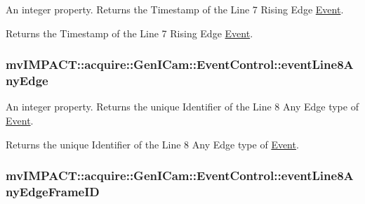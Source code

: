 An integer property. Returns the Timestamp of the Line 7 Rising Edge \hyperlink{classmv_i_m_p_a_c_t_1_1acquire_1_1_event}{Event}. 

Returns the Timestamp of the Line 7 Rising Edge \hyperlink{classmv_i_m_p_a_c_t_1_1acquire_1_1_event}{Event}. \hypertarget{classmv_i_m_p_a_c_t_1_1acquire_1_1_gen_i_cam_1_1_event_control_a4409ff726b719aef9f6ad4bb4cdab03b}{
\subsubsection[{event\+Line8\+Any\+Edge}]{ mv\+I\+M\+P\+A\+C\+T\+::acquire\+::\+Gen\+I\+Cam\+::\+Event\+Control\+::event\+Line8\+Any\+Edge}}\label{classmv_i_m_p_a_c_t_1_1acquire_1_1_gen_i_cam_1_1_event_control_a4409ff726b719aef9f6ad4bb4cdab03b}


An integer property. Returns the unique Identifier of the Line 8 Any Edge type of \hyperlink{classmv_i_m_p_a_c_t_1_1acquire_1_1_event}{Event}. 

Returns the unique Identifier of the Line 8 Any Edge type of \hyperlink{classmv_i_m_p_a_c_t_1_1acquire_1_1_event}{Event}. \hypertarget{classmv_i_m_p_a_c_t_1_1acquire_1_1_gen_i_cam_1_1_event_control_acffb507d66c7247765308140685d7179}{
\subsubsection[{event\+Line8\+Any\+Edge\+Frame\+I\+D}]{ mv\+I\+M\+P\+A\+C\+T\+::acquire\+::\+Gen\+I\+Cam\+::\+Event\+Control\+::event\+Line8\+Any\+Edge\+Frame\+I\+D}}\label{classmv_i_m_p_a_c_t_1_1acquire_1_1_gen_i_cam_1_1_event_control_acffb507d66c7247765308140685d7179}


